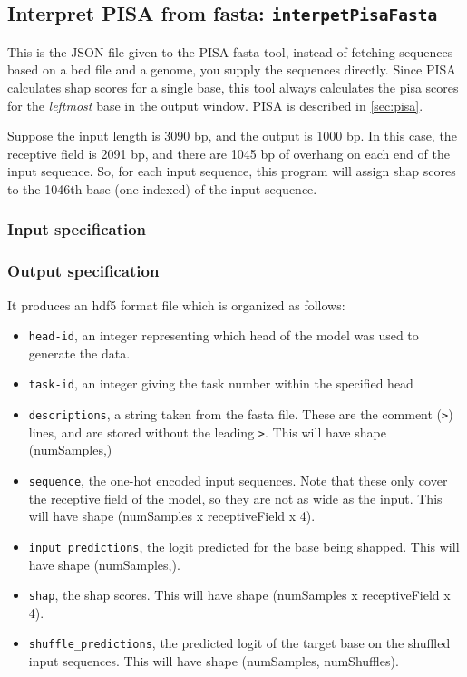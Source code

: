 \documentclass{article}
\begin{document}
\newpage

\subsection{Interpret PISA from fasta: \texttt{interpetPisaFasta}}\label{prog:interpretPisaFasta}

This is the JSON file given to the PISA fasta tool, instead of fetching sequences based on a bed
file and a genome, you supply the sequences directly.
Since PISA calculates shap scores for a single base, this tool always calculates the pisa scores
for the \emph{leftmost} base in the output window. PISA is described in \ref{sec:pisa}.

Suppose the input length is 3090 bp, and the output is 1000 bp.
In this case, the receptive field is 2091 bp, and there are 1045 bp of overhang on each end of
the input sequence.
So, for each input sequence, this program will assign shap scores to the 1046th base (one-indexed)
of the input sequence.

\subsubsection{Input specification}


\subsubsection{Output specification}

It produces an hdf5 format file which is organized as follows:

\begin{itemize}
    \item \texttt{head-id}, an integer representing which head of the model was used to generate
        the data.
    \item \texttt{task-id}, an integer giving the task number within the specified head
    \item \texttt{descriptions}, a string taken from the fasta file. These are the comment
        (\texttt{>}) lines, and are stored without the leading \texttt{>}. This will
        have shape (numSamples,)
    \item \texttt{sequence}, the one-hot encoded input sequences. Note that these only cover
        the receptive field of the model, so they are not as wide as the input. This will have
        shape (numSamples x receptiveField x 4).
    \item \texttt{input\_predictions}, the logit predicted for the base being shapped.
        This will have shape (numSamples,).
    \item \texttt{shap}, the shap scores. This will have shape (numSamples x receptiveField x 4).
    \item \texttt{shuffle\_predictions}, the predicted logit of the target base on the shuffled
        input sequences. This will have shape (numSamples, numShuffles).
\end{itemize}
\end{document}

